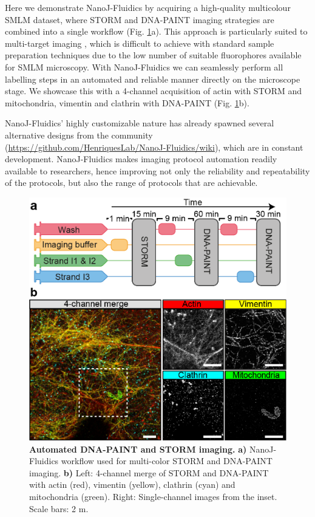  Here we demonstrate NanoJ-Fluidics by acquiring a high-quality multicolour SMLM dataset, where STORM and DNA-PAINT \cite{jungmann2014multiplexed} imaging strategies are combined into a single workflow (Fig. \ref{fig:PAINT}a). This approach is particularly suited to multi-target imaging \cite{dempsey2011evaluation}, which is difficult to achieve with standard sample preparation techniques due to the low number of suitable fluorophores available for SMLM microscopy. With NanoJ-Fluidics we can seamlessly perform all labelling steps in an automated and reliable manner directly on the microscope stage. We showcase this with a 4-channel acquisition of actin with STORM and mitochondria, vimentin and clathrin with DNA-PAINT (Fig. \ref{fig:PAINT}b). 

 NanoJ-Fluidics' highly customizable nature has already spawned several alternative designs from the community (\href{https://github.com/HenriquesLab/NanoJ-Fluidics/wiki}{https://github.com/HenriquesLab/NanoJ-Fluidics/wiki}), which are in constant development. NanoJ-Fluidics makes imaging protocol automation readily available to researchers, hence improving not only the reliability and repeatability of the protocols, but also the range of protocols that are achievable.  

 \begin{figure}[!t]
    \centering
    \includegraphics{Figures/FigurePumpy_v3.png}
    \caption{\textbf{Automated DNA-PAINT and STORM imaging.} \textbf{a)} NanoJ-Fluidics workflow used for multi-color STORM and DNA-PAINT imaging. \textbf{b)} Left: 4-channel merge of STORM and DNA-PAINT with actin (red), vimentin (yellow), clathrin (cyan) and mitochondria (green). Right: Single-channel images from the inset. Scale bars: 2 \textmu{}m.}
    \label{fig:PAINT}
 \end{figure}

